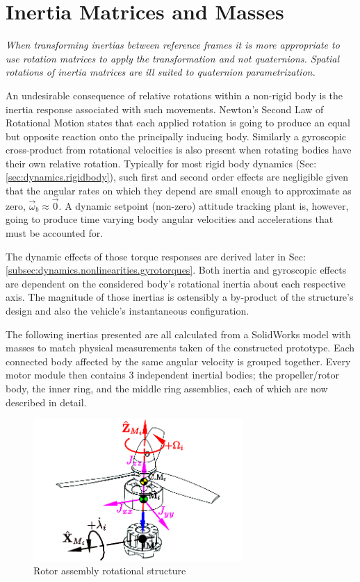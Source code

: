 \section{Inertia Matrices and Masses}
\label{sec:proto.inertia}
\emph{\color{Gray}When transforming inertias between reference frames it is more appropriate to use rotation matrices to apply the transformation and not quaternions. Spatial rotations of inertia matrices are ill suited to quaternion parametrization.}
\par
An undesirable consequence of relative rotations within a non-rigid body is the inertia response associated with such movements. Newton's Second Law of Rotational Motion states that each applied rotation is going to produce an equal but opposite reaction onto the principally inducing body. Similarly a gyroscopic cross-product from rotational velocities is also present when rotating bodies have their own relative rotation. Typically for most rigid body dynamics (Sec:\ref{sec:dynamics.rigidbody}), such first and second order effects are negligible given that the angular rates on which they depend are small enough to approximate as zero, $\vec{\omega}_b\approx\vec{0}$. A dynamic setpoint (non-zero) attitude tracking plant is, however, going to produce time varying body angular velocities and accelerations that must be accounted for.
\par
The dynamic effects of those torque responses are derived later in Sec:\ref{subsec:dynamics.nonlinearities.gyrotorques}. Both inertia and gyroscopic effects are dependent on the considered body's rotational inertia about each respective axis. The magnitude of those inertias is ostensibly a by-product of the structure's design and also the vehicle's instantaneous configuration.
\par
The following inertias presented are all calculated from a SolidWorks model with masses to match physical measurements taken of the constructed prototype. Each connected body affected by the same angular velocity is grouped together. Every motor module then contains 3 independent inertial bodies; the propeller/rotor body, the inner ring, and the middle ring assemblies, each of which are now described in detail. 
\begin{figure}[hbtp]
\vspace{-6pt}
\centering
\includegraphics[width=0.71\textwidth]{figs/inertia-prop}
\caption{Rotor assembly rotational structure}
\label{fig:inertia-prop}
\vspace{-14pt}
\end{figure}
